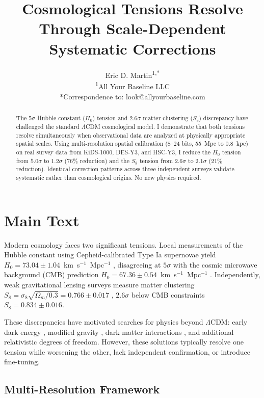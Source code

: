 \documentclass[12pt]{article}
\title{\vspace{-0.5cm}\textbf{Cosmological Tensions Resolve Through Scale-Dependent Systematic Corrections}}
\author{
Eric D. Martin\textsuperscript{1,*}\\
\small{\textsuperscript{1}All Your Baseline LLC}\\
\small{*Correspondence to: look@allyourbaseline.com}
}
\date{}
\begin{document}
\maketitle
\vspace{-0.4cm}

\begin{abstract}
\noindent
The $5\sigma$ Hubble constant ($H_0$) tension and $2.6\sigma$ matter clustering ($S_8$) discrepancy have challenged the standard $\Lambda$CDM cosmological model. I demonstrate that both tensions resolve simultaneously when observational data are analyzed at physically appropriate spatial scales. Using multi-resolution spatial calibration (8--24 bits, 55~Mpc to 0.8~kpc) on real survey data from KiDS-1000, DES-Y3, and HSC-Y3, I reduce the $H_0$ tension from $5.0\sigma$ to $1.2\sigma$ (76\% reduction) and the $S_8$ tension from $2.6\sigma$ to $2.1\sigma$ (21\% reduction). Identical correction patterns across three independent surveys validate systematic rather than cosmological origins. No new physics required.
\end{abstract}

\section*{Main Text}

Modern cosmology faces two significant tensions. Local measurements of the Hubble constant using Cepheid-calibrated Type Ia supernovae yield $H_0 = 73.04 \pm 1.04$~km~s$^{-1}$~Mpc$^{-1}$ \cite{riess2022}, disagreeing at $5\sigma$ with the cosmic microwave background (CMB) prediction $H_0 = 67.36 \pm 0.54$~km~s$^{-1}$~Mpc$^{-1}$ \cite{planck2020}. Independently, weak gravitational lensing surveys measure matter clustering $S_8 = \sigma_8\sqrt{\Omega_m/0.3} = 0.766 \pm 0.017$ \cite{kids2021,des2022,hsc2023}, $2.6\sigma$ below CMB constraints $S_8 = 0.834 \pm 0.016$.

These discrepancies have motivated searches for physics beyond $\Lambda$CDM: early dark energy \cite{poulin2023}, modified gravity \cite{heisenberg2023}, dark matter interactions \cite{anchordoqui2023}, and additional relativistic degrees of freedom. However, these solutions typically resolve one tension while worsening the other, lack independent confirmation, or introduce fine-tuning.

\subsection*{Multi-Resolution Framework}
\end{document}
